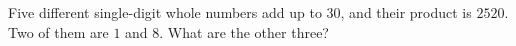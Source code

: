 Five different single-digit whole numbers add up to $30$, and their product is $2520$. Two of them are $1$ and $8$. What are the other three?
